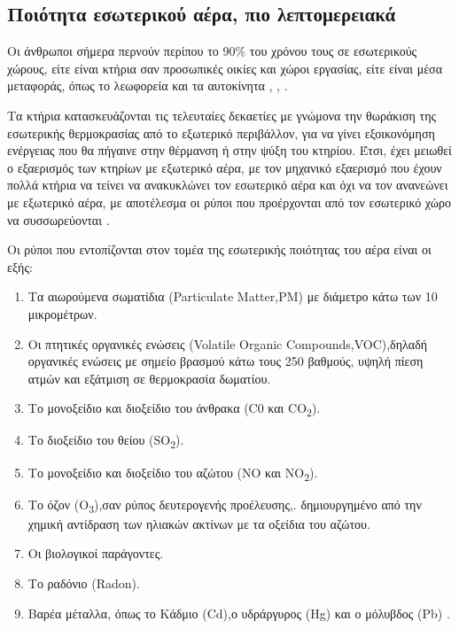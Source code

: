 \subsection{Ποιότητα εσωτερικού αέρα, πιο λεπτομερειακά}

Οι άνθρωποι σήμερα περνούν περίπου το 90\% του χρόνου τους σε εσωτερικούς χώρους, είτε είναι κτήρια σαν προσωπικές οικίες και χώροι εργασίας,
είτε είναι μέσα μεταφοράς, όπως το λεωφορεία και τα αυτοκίνητα \cite{Klepeis2001}, \cite{LAI2004}, \cite{ec2003indoor}.

Τα κτήρια κατασκευάζονται τις τελευταίες δεκαετίες με γνώμονα την θωράκιση της εσωτερικής θερμοκρασίας από το εξωτερικό περιβάλλον,
για να γίνει εξοικονόμηση ενέργειας που θα πήγαινε στην θέρμανση ή στην ψύξη του κτηρίου.
Έτσι, έχει μειωθεί ο εξαερισμός των κτηρίων με εξωτερικό αέρα,
με τον μηχανικό εξαερισμό που έχουν πολλά κτήρια να τείνει να ανακυκλώνει τον εσωτερικό αέρα και όχι να τον ανανεώνει με εξωτερικό αέρα,
με αποτέλεσμα οι ρύποι που προέρχονται από τον εσωτερικό χώρο να συσσωρεύονται \cite{GONZALEZMARTIN2021128376}.

Οι ρύποι που εντοπίζονται στον τομέα της εσωτερικής ποιότητας του αέρα είναι οι εξής:

\begin{enumerate}
 \item Τα αιωρούμενα σωματίδια (Particulate Matter,PM) με διάμετρο κάτω των 10 μικρομέτρων.
 \item Οι πτητικές οργανικές ενώσεις (Volatile Organic Compounds,VOC),δηλαδή οργανικές ενώσεις με σημείο βρασμού κάτω τους 250 βαθμούς, υψηλή πίεση ατμών και εξάτμιση σε θερμοκρασία δωματίου.
 \item Το μονοξείδιο και διοξείδιο του άνθρακα (C0 και CO\textsubscript{2}).
 \item Το διοξείδιο του θείου (SO\textsubscript{2}).
 \item Το μονοξείδιο και διοξείδιο του αζώτου (NO και NO\textsubscript{2}).
 \item Το όζον (O\textsubscript{3}),σαν ρύπος δευτερογενής προέλευσης,.
δημιουργημένο από την χημική αντίδραση των ηλιακών ακτίνων με τα οξείδια του αζώτου.
 \item Οι βιολογικοί παράγοντες.
 \item Το ραδόνιο (Radon).
 \item Βαρέα μέταλλα, όπως το Κάδμιο (Cd),ο υδράργυρος (Hg) και ο μόλυβδος (Pb) \cite{EEA2025}.

\end{enumerate}


